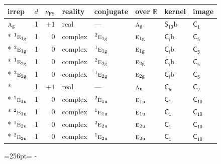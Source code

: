 \documentclass[10pt,a4paper]{article}
\newcommand{\needspace}[1]{\par\penalty-100\begingroup\dimen0=#1\relax\dimen2=\pagegoal
  \advance\dimen2-\pagetotal\ifdim\dimen0>\dimen2\relax\ifdim\dimen2>0pt\vfil\break\fi\fi
  \endgroup}
\numberwithin{equation}{section}
\newcommand{\grp}[1]{\mathsf{#1}}
\newcommand{\irr}[1]{\text{\normalfont\scshape #1}}
\newcommand{\conjpair}[1]{{}^{#1}}
\newcommand{\detbox}[1]{{\setlength{\fboxsep}{1pt}\fbox{#1}}}
\newcommand{\ptag}[1]{\mathrm{#1}}
\newcommand{\fsind}{\nu_{\mathrm{FS}}}
\newcommand{\secondclass}{\mathrm{b}}
\begin{document}
{\small\renewcommand{\arraystretch}{1.25}\setlength{\tabcolsep}{4pt}\begin{longtable}{@{}lrrlllll@{}}\toprule
irrep & $d$ & $\fsind$ & reality & conjugate & over $\mathbb{R}$ & kernel & image\\\midrule\endhead
\bottomrule\endfoot\endlastfoot
$\irr{a}_{\ptag{g}}$ & 1 & $+1$ & real & --- & $\irr{a}_{\ptag{g}}$ & \href{S10b.pdf}{$\grp{S_{10}}\secondclass$} & \href{../../../rotation/data/pdf/C1.pdf}{$\grp{C_{1}}$}\\*
$\conjpair{1}\irr{e}_{1\ptag{g}}$ & 1 & $0$ & complex & $\conjpair{2}\irr{e}_{1\ptag{g}}$ & $\irr{e}_{1\ptag{g}}$ & \href{S2b.pdf}{$\grp{C_{i}}\secondclass$} & \href{../../../rotation/data/pdf/C5.pdf}{$\grp{C_{5}}$}\\*
$\conjpair{2}\irr{e}_{1\ptag{g}}$ & 1 & $0$ & complex & $\conjpair{1}\irr{e}_{1\ptag{g}}$ & $\irr{e}_{1\ptag{g}}$ & \href{S2b.pdf}{$\grp{C_{i}}\secondclass$} & \href{../../../rotation/data/pdf/C5.pdf}{$\grp{C_{5}}$}\\*
$\conjpair{1}\irr{e}_{2\ptag{g}}$ & 1 & $0$ & complex & $\conjpair{2}\irr{e}_{2\ptag{g}}$ & $\irr{e}_{2\ptag{g}}$ & \href{S2b.pdf}{$\grp{C_{i}}\secondclass$} & \href{../../../rotation/data/pdf/C5.pdf}{$\grp{C_{5}}$}\\*
$\conjpair{2}\irr{e}_{2\ptag{g}}$ & 1 & $0$ & complex & $\conjpair{1}\irr{e}_{2\ptag{g}}$ & $\irr{e}_{2\ptag{g}}$ & \href{S2b.pdf}{$\grp{C_{i}}\secondclass$} & \href{../../../rotation/data/pdf/C5.pdf}{$\grp{C_{5}}$}\\*
\detbox{$\irr{a}_{\ptag{u}}$} & 1 & $+1$ & real & --- & $\irr{a}_{\ptag{u}}$ & \href{C5.pdf}{$\grp{C_{5}}$} & \href{../../../rotation/data/pdf/C2.pdf}{$\grp{C_{2}}$}\\*
$\conjpair{1}\irr{e}_{1\ptag{u}}$ & 1 & $0$ & complex & $\conjpair{2}\irr{e}_{1\ptag{u}}$ & $\irr{e}_{1\ptag{u}}$ & \href{C1.pdf}{$\grp{C_{1}}$} & \href{../../../rotation/data/pdf/C10.pdf}{$\grp{C_{10}}$}\\*
$\conjpair{2}\irr{e}_{1\ptag{u}}$ & 1 & $0$ & complex & $\conjpair{1}\irr{e}_{1\ptag{u}}$ & $\irr{e}_{1\ptag{u}}$ & \href{C1.pdf}{$\grp{C_{1}}$} & \href{../../../rotation/data/pdf/C10.pdf}{$\grp{C_{10}}$}\\*
$\conjpair{1}\irr{e}_{2\ptag{u}}$ & 1 & $0$ & complex & $\conjpair{2}\irr{e}_{2\ptag{u}}$ & $\irr{e}_{2\ptag{u}}$ & \href{C1.pdf}{$\grp{C_{1}}$} & \href{../../../rotation/data/pdf/C10.pdf}{$\grp{C_{10}}$}\\*
$\conjpair{2}\irr{e}_{2\ptag{u}}$ & 1 & $0$ & complex & $\conjpair{1}\irr{e}_{2\ptag{u}}$ & $\irr{e}_{2\ptag{u}}$ & \href{C1.pdf}{$\grp{C_{1}}$} & \href{../../../rotation/data/pdf/C10.pdf}{$\grp{C_{10}}$}\\
\bottomrule\end{longtable}}
\needspace{256pt}
\end{document}
